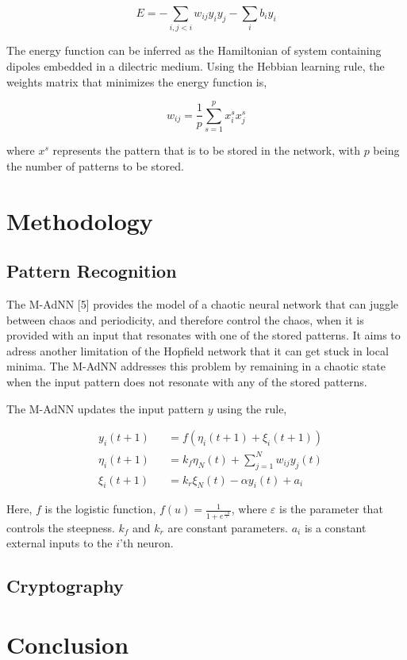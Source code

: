 \documentclass[12pt, letterpaper]{article}
\begin{document}
$$
E = -\sum_{i,j < i} w_{ij}y_i y_j - \sum_{i} b_i y_i
$$

The energy function can be inferred as the Hamiltonian of system containing dipoles embedded in a dilectric medium. Using the Hebbian learning rule, the weights matrix that minimizes the energy function is,

$$
w_{ij} = \frac{1}{p} \sum_{s=1}^p x_i^s x_j^s
$$

where $x^s$ represents the pattern that is to be stored in the network, with $p$ being the number of patterns to be stored.

\section*{Methodology}

\subsection*{Pattern Recognition}

The M-AdNN [5] provides the model of a chaotic neural network that can juggle between chaos and periodicity, and therefore control the chaos, when it is provided with an input that resonates with one of the stored patterns. It aims to adress another limitation of the Hopfield network that it can get stuck in local minima. The M-AdNN addresses this problem by remaining in a chaotic state when the input pattern does not resonate with any of the stored patterns.

The M-AdNN updates the input pattern $y$ using the rule,

$$
\begin{aligned}
& y_i(t+1) &&= f(\eta_i(t+1) + \xi_i(t+1))\\
& \eta_i(t+1) &&= k_f \eta_N(t) + \sum_{j = 1}^N w_{ij} y_j(t)\\
& \xi_i(t+1) &&= k_r \xi_N(t) - \alpha y_i(t) + a_i
\end{aligned}
$$

Here, $f$ is the logistic function, $f(u) = \frac{1}{1 + e^\frac{-u}{\varepsilon}}$, where $\varepsilon$ is the parameter that controls the steepness. $k_f$ and $k_r$ are constant parameters. $a_i$ is a constant external inputs to the $i$'th neuron.

\subsection*{Cryptography}

\section*{Conclusion}
\end{document}
